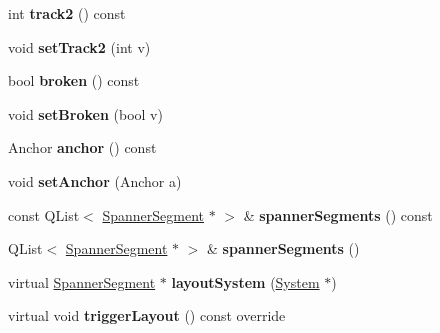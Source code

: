 \begin{DoxyCompactItemize}
\item 
\mbox{\label{class_ms_1_1_spanner_a523e1a2fb656322a4dba0440271bbd12}} 
int {\bfseries track2} () const
\item 
\mbox{\label{class_ms_1_1_spanner_a6924785e59e53240f35c6da8e846bc7e}} 
void {\bfseries set\+Track2} (int v)
\item 
\mbox{\label{class_ms_1_1_spanner_a8b633cdeb15a810713c62c2bf6db9dc4}} 
bool {\bfseries broken} () const
\item 
\mbox{\label{class_ms_1_1_spanner_ad8ca68d182ec59cbdbf2bf40a332921c}} 
void {\bfseries set\+Broken} (bool v)
\item 
\mbox{\label{class_ms_1_1_spanner_a646ff7786639fcd95dcefe5b206754d7}} 
Anchor {\bfseries anchor} () const
\item 
\mbox{\label{class_ms_1_1_spanner_aa58ff572b3afa46620e63c5f240d5fe1}} 
void {\bfseries set\+Anchor} (Anchor a)
\item 
\mbox{\label{class_ms_1_1_spanner_a6c653a90241d389023670a190e83b900}} 
const Q\+List$<$ \hyperlink{class_ms_1_1_spanner_segment}{Spanner\+Segment} $\ast$ $>$ \& {\bfseries spanner\+Segments} () const
\item 
\mbox{\label{class_ms_1_1_spanner_a567825b9c26ceb3f15156e1793aae5a6}} 
Q\+List$<$ \hyperlink{class_ms_1_1_spanner_segment}{Spanner\+Segment} $\ast$ $>$ \& {\bfseries spanner\+Segments} ()
\item 
\mbox{\label{class_ms_1_1_spanner_a23809f0b95c2bca9e2907bd534d780b7}} 
virtual \hyperlink{class_ms_1_1_spanner_segment}{Spanner\+Segment} $\ast$ {\bfseries layout\+System} (\hyperlink{class_ms_1_1_system}{System} $\ast$)
\item 
\mbox{\label{class_ms_1_1_spanner_a886c534e1957c5340705da3c215bfe06}} 
virtual void {\bfseries trigger\+Layout} () const override
\item 
\mbox{\label{class_ms_1_1_spanner_afe04fd23f1b64719c91eb7b6ec42be69}} 

\end{DoxyCompactItemize}
